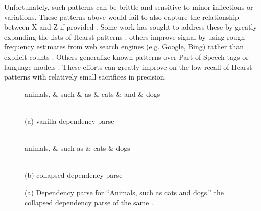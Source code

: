 Unfortunately, such patterns can be brittle and sensitive to minor inflections
or variations.  These patterns above would fail to also capture the
relationship between X and Z if provided . Some work
has sought to address these by greatly expanding the lists of Hearst
patterns \cite{needcite,seitner:2016:lrec}; others improve signal by using
rough frequency estimates from web search engines (e.g. Google, Bing) rather
than explicit counts \cite{seitner:2016:lrec}. Others generalize known patterns
over Part-of-Speech tags \cite{sang:2007:acl} or language models
\cite{ritter:2009:aaai}. These efforts can greatly improve on the low recall
of Hearst patterns with relatively small sacrifices in precision.

\begin{figure}
\centering
\begin{dependency}[edge vertical padding=0.5ex, edge style={black},
                  label style={fill=black,text=white,font=\ttfamily}]
  \begin{deptext}[column sep=0.7cm,nodes={font=\large}]
    animals, \& such \& as \& cats \& and \& dogs\\
  \end{deptext}
\end{dependency}\\
{\small (a) vanilla dependency parse}\\~\\
\begin{dependency}[edge vertical padding=0.5ex, edge style={black},
                  label style={fill=black,text=white,font=\ttfamily}]
  \begin{deptext}[column sep=0.7cm,nodes={font=\large}]
    animals, \& such as \& cats \& dogs \\
  \end{deptext}
\end{dependency}\\
{\small (b) collapsed dependency parse}\\
\caption{(a) Dependency parse for ``Animals, such
as cats and dogs.'' the collapsed dependency parse of the same
\cite{marneffe:2008:techreport}.}
\label{fig:collapseddep}
\end{figure}


